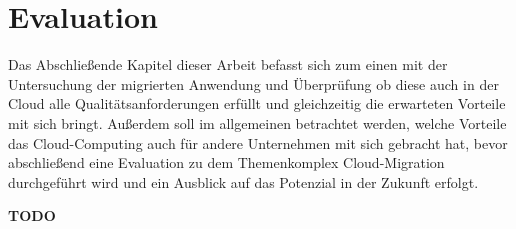 \chapter{Evaluation}
Das Abschließende Kapitel dieser Arbeit befasst sich zum einen mit der Untersuchung der migrierten Anwendung und Überprüfung ob diese auch in der Cloud alle Qualitätsanforderungen erfüllt und gleichzeitig die erwarteten Vorteile mit sich bringt. Außerdem soll im allgemeinen betrachtet werden, welche Vorteile das Cloud-Computing auch für andere Unternehmen mit sich gebracht hat, bevor abschließend eine Evaluation zu dem Themenkomplex Cloud-Migration durchgeführt wird und ein Ausblick auf das Potenzial in der Zukunft erfolgt.






\textbf{TODO}